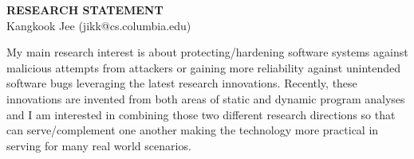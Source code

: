 \documentclass[letterpaper, 10pt]{article}
\begin{document}
\thispagestyle{fancy}

\lhead{}
\rhead{}

\renewcommand{\headrulewidth}{0pt} \renewcommand{\footrulewidth}{0pt}
\fancyfoot[C]{\footnotesize
  \textcolor{gray}{http://www.cs.columbia.edu/$\sim$jikk/application}}

\pagestyle{fancy}
\lhead{\textcolor{gray}{\it Kangkook Jee}}
\rhead{\textcolor{gray}{\thepage /\pageref{LastPage}}}

\begin{small}

\begin{center}
{\LARGE \bf RESEARCH STATEMENT}\\
\vspace*{0.1cm}
{\normalsize Kangkook Jee (jikk@cs.columbia.edu)}
\end{center}



My main research interest is about protecting/hardening software systems
against malicious attempts from attackers or gaining more reliability against
unintended software bugs leveraging the latest research innovations. Recently,
these innovations are invented from both areas of static and dynamic program
analyses and I am interested in combining those two different research
directions so that can serve/complement one another making the technology more
practical in serving for many real world scenarios.


\end{small}
\end{document}
